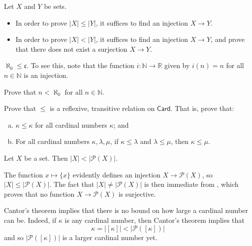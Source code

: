 \begin{strategy}
Let $X$ and $Y$ be sets.
\begin{itemize}
\item In order to prove $|X| \le |Y|$, it suffices to find an injection $X \to Y$.
\item In order to prove $|X| < |Y|$, it suffices to find an injection $X \to Y$, and prove that there does not exist a surjection $X \to Y$.
\end{itemize}
\end{strategy}

\begin{example}
$\aleph_0 \le \mathfrak{c}$. To see this, note that the function $i : \mathbb{N} \to \mathbb{R}$ given by $i(n)=n$ for all $n \in \mathbb{N}$ is an injection.
\end{example}

\begin{exercise}
Prove that $n < \aleph_0$ for all $n \in \mathbb{N}$.
\end{exercise}

\begin{exercise}
Prove that $\le$ is a reflexive, transitive relation on $\mathsf{Card}$. That is, prove that:
\begin{enumerate}[(a)]
\item $\kappa \le \kappa$ for all cardinal numbers $\kappa$; and
\item For all cardinal numbers $\kappa, \lambda, \mu$, if $\kappa \le \lambda$ and $\lambda \le \mu$, then $\kappa \le \mu$.
\end{enumerate}
\end{exercise}

\begin{theorem}
\label{thmCantor}
Let $X$ be a set. Then $|X| < |\mathcal{P}(X)|$.
\end{theorem}

\begin{cproof}
The function $x \mapsto \{ x \}$ evidently defines an injection $X \to \mathcal{P}(X)$, so $|X| \le |\mathcal{P}(X)|$. The fact that $|X| \ne |\mathcal{P}(X)|$ is then immediate from , which proves that no function $X \to \mathcal{P}(X)$ is surjective.
\end{cproof}

Cantor's theorem implies that there is no bound on how large a cardinal number can be. Indeed, if $\kappa$ is any cardinal number, then Cantor's theorem implies that
\[ \kappa = |[\kappa]| < |\mathcal{P}([\kappa])| \]
and so $|\mathcal{P}([\kappa])|$ is a larger cardinal number yet.

